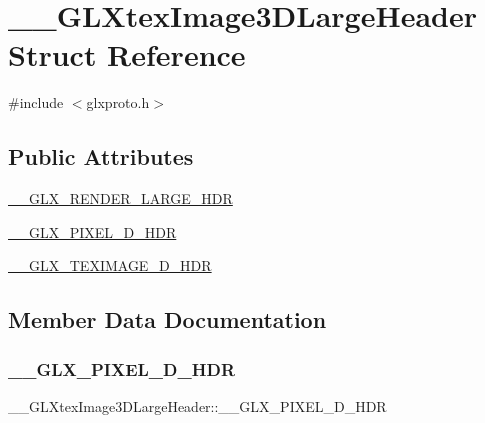 \hypertarget{struct_____g_l_xtex_image3_d_large_header}{}\section{\+\_\+\+\_\+\+G\+L\+Xtex\+Image3\+D\+Large\+Header Struct Reference}
\label{struct_____g_l_xtex_image3_d_large_header}


{\ttfamily \#include $<$glxproto.\+h$>$}

\subsection*{Public Attributes}
\begin{DoxyCompactItemize}
\item 
\hyperlink{struct_____g_l_xtex_image3_d_large_header_aa65a4e8ccaaa0682d1a767efd35ee009}{\+\_\+\+\_\+\+G\+L\+X\+\_\+\+R\+E\+N\+D\+E\+R\+\_\+\+L\+A\+R\+G\+E\+\_\+\+H\+DR}
\item 
\hyperlink{struct_____g_l_xtex_image3_d_large_header_aaf316224c426aed035e514a4fc4b3ebb}{\+\_\+\+\_\+\+G\+L\+X\+\_\+\+P\+I\+X\+E\+L\+\_\+D\+\_\+\+H\+DR}
\item 
\hyperlink{struct_____g_l_xtex_image3_d_large_header_a890bb256cbf502c712426575cc33f37e}{\+\_\+\+\_\+\+G\+L\+X\+\_\+\+T\+E\+X\+I\+M\+A\+G\+E\+\_\+D\+\_\+\+H\+DR}
\end{DoxyCompactItemize}


\subsection{Member Data Documentation}
\mbox{\label{struct_____g_l_xtex_image3_d_large_header_aaf316224c426aed035e514a4fc4b3ebb}} 
\subsubsection{\texorpdfstring{\+\_\+\+\_\+\+G\+L\+X\+\_\+\+P\+I\+X\+E\+L\+\_\+D\+\_\+\+H\+DR}{\_\_GLX\_PIXEL\_3D\_HDR}}
{\footnotesize\ttfamily \+\_\+\+\_\+\+G\+L\+Xtex\+Image3\+D\+Large\+Header\+::\+\_\+\+\_\+\+G\+L\+X\+\_\+\+P\+I\+X\+E\+L\+\_\+D\+\_\+\+H\+DR}


